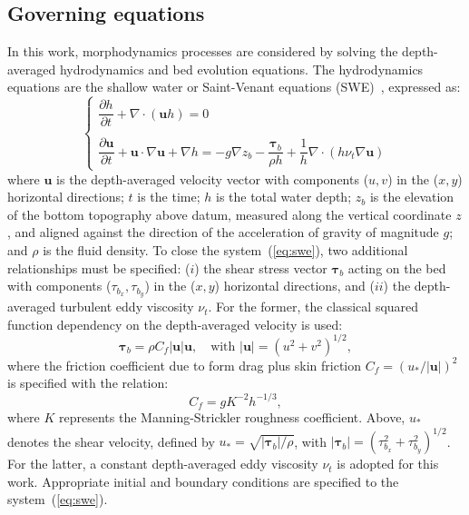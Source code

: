 \subsection{Governing equations}\label{subsec:goveq}
In this work, morphodynamics processes are considered by solving the depth-averaged hydrodynamics and bed evolution equations. The hydrodynamics equations are the shallow water or Saint-Venant equations (SWE)~\cite{HYP:HYP611}, expressed as:
\begin{equation}\label{eq:swe}
\left\{
	\begin{array}{l}
	  \dfrac{\partial h}{\partial t} + \nabla \cdot (\mathbf uh) = 0 \\
          \\
          \dfrac{\partial \mathbf u}{\partial t} + \mathbf u \cdot \nabla\mathbf u + \nabla h = -g \nabla z_b - \dfrac{\boldsymbol \tau_b}{\rho h} + \dfrac{1}{h} \nabla \cdot (h \nu_t \nabla \mathbf u)
	\end{array}
\right.
\end{equation}
where $\mathbf u$ is the depth-averaged velocity vector with components ($u, v$) in the ($x, y$) horizontal directions; $t$ is the time; $h$ is the total water depth; $z_b$ is the elevation of the bottom topography above datum, measured along the vertical coordinate $z$, and aligned against the direction of the acceleration of gravity of magnitude $g$; and $\rho$ is the fluid density. To close the system~(\ref{eq:swe}), two additional relationships must be specified: ($i$) the shear stress vector $\boldsymbol \tau_b$ acting on the bed with components ($\tau_{b_x}, \tau_{b_y}$) in the ($x, y$) horizontal directions, and ($ii$) the depth-averaged turbulent eddy viscosity $\nu_t$. For the former, the
classical squared function dependency on the depth-averaged velocity is used:
\begin{equation}
\boldsymbol \tau_b = \rho C_f |\mathbf u|\mathbf u, \quad\text{with}\,\, |\mathbf u|=(u^2+v^2)^{1/2},
\end{equation}
where the friction coefficient due to form drag plus skin friction $C_f = (u_*/|\mathbf u|)^2$ is specified with the relation:
\begin{equation}
C_f = g K^{-2} h^{-1/3},
\end{equation}
where $K$ represents the Manning-Strickler roughness coefficient. Above, $u_*$ denotes the shear velocity, defined by $u_*=\sqrt{|\boldsymbol \tau_b|/\rho}$, with $|\boldsymbol \tau_b|=(\tau_{b_x}^2+\tau_{b_y}^2)^{1/2}$. For the latter, a constant depth-averaged eddy viscosity $\nu_t$ is adopted for this work. Appropriate initial and boundary conditions are specified to the system~(\ref{eq:swe}). %

